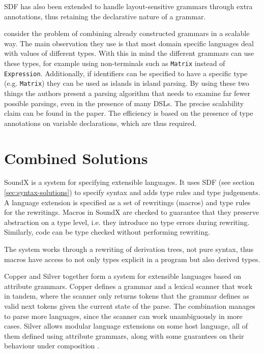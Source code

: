 \documentclass{kththesis}
\begin{document}
SDF has also been extended \cite{Erdweg2013Layout-sensitiv} to handle layout-sensitive grammars through extra annotations, thus retaining the declarative nature of a grammar.

\textcite{Silkensen2013Well-Typed-Isla} consider the problem of combining already constructed grammars in a scalable way. The main observation they use is that most domain specific languages deal with values of different types. With this in mind the different grammars can use these types, for example using non-terminals such as \texttt{Matrix} instead of \texttt{Expression}. Additionally, if identifiers can be specified to have a specific type (e.g. \texttt{Matrix}) they can be used as islands in island parsing. By using these two things the authors present a parsing algorithm that needs to examine far fewer possible parsings, even in the presence of many DSLs. The precise scalability claim can be found in the paper. The efficiency is based on the presence of type annotations on variable declarations, which are thus required.

\section{Combined Solutions} \label{sec:full-solutions}

SoundX \cite{Lorenzen2016Sound-type-depe} is a system for specifying extensible languages. It uses SDF (see section \ref{sec:syntax-solutions}) to specify syntax and adds type rules and type judgements. A language extension is specified as a set of rewritings (macros) and type rules for the rewritings. Macros in SoundX are checked to guarantee that they preserve abstraction on a type level, i.e. they introduce no type errors during rewriting. Similarly, code can be type checked without performing rewriting.

The system works through a rewriting of derivation trees, not pure syntax, thus macros have access to not only types explicit in a program but also derived types.

Copper \cite{Van-Wyk2007Context-aware-s} and Silver \cite{Van-Wyk2010Silver:-An-exte} together form a system for extensible languages based on attribute grammars. Copper defines a grammar and a lexical scanner that work in tandem, where the scanner only returns tokens that the grammar defines as valid next tokens given the current state of the parse. The combination manages to parse more languages, since the scanner can work unambiguously in more cases. Silver allows modular language extensions on some host language, all of them defined using attribute grammars, along with some guarantees on their behaviour under composition \cite{Kaminski2017Reliably-compos}.
\end{document}
